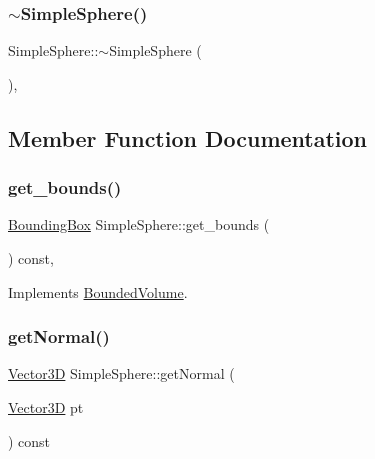\subsubsection{\texorpdfstring{$\sim$SimpleSphere()}{~SimpleSphere()}}
{\footnotesize\ttfamily Simple\+Sphere\+::$\sim$\+Simple\+Sphere (\begin{DoxyParamCaption}{ }\end{DoxyParamCaption})\hspace{0.3cm}{\ttfamily [override]}, {\ttfamily [default]}}



\subsection{Member Function Documentation}
\mbox{\label{classSimpleSphere_aa5b6b2ebbe3de4490cdaa0f5c08b961c}} 
\subsubsection{\texorpdfstring{get\_bounds()}{get\_bounds()}}
{\footnotesize\ttfamily \mbox{\hyperlink{classBoundingBox}{Bounding\+Box}} Simple\+Sphere\+::get\+\_\+bounds (\begin{DoxyParamCaption}{ }\end{DoxyParamCaption}) const\hspace{0.3cm}{\ttfamily [override]}, {\ttfamily [virtual]}}



Implements \mbox{\hyperlink{classBoundedVolume_a281168c4d827c38b46e639f6e4991a9e}{Bounded\+Volume}}.

\mbox{\label{classSimpleSphere_a792d6ab934b8015c607a632aa0d169bd}} 
\subsubsection{\texorpdfstring{getNormal()}{getNormal()}}
{\footnotesize\ttfamily \mbox{\hyperlink{classVector3D}{Vector3D}} Simple\+Sphere\+::get\+Normal (\begin{DoxyParamCaption}\item[{\mbox{\hyperlink{classVector3D}{Vector3D}}}]{pt }\end{DoxyParamCaption}) const\hspace{0.3cm}{\ttfamily [protected]}}

